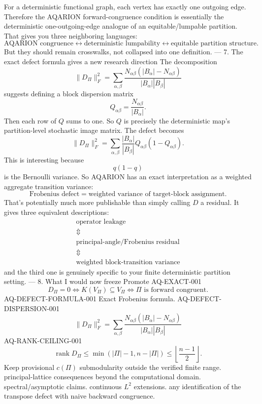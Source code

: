 For a deterministic functional graph, each vertex has exactly one outgoing edge. Therefore the AQARION forward-congruence condition is essentially the deterministic one-outgoing-edge analogue of an equitable/lumpable partition.
That gives you three neighboring languages:
\[
\boxed{
\text{AQARION congruence}
\leftrightarrow
\text{deterministic lumpability}
\leftrightarrow
\text{equitable partition structure}.
}
\]
But they should remain crosswalks, not collapsed into one definition.
---
7. The exact defect formula gives a new research direction
The decomposition
\[
\|D_\Pi\|_F^2
=
\sum_{\alpha,\beta}
\frac{N_{\alpha\beta}(|B_\alpha|-N_{\alpha\beta})}
{|B_\alpha||B_\beta|}
\]
suggests defining a block dispersion matrix
\[
Q_{\alpha\beta}
=
\frac{N_{\alpha\beta}}{|B_\alpha|}.
\]
Then each row of \(Q\) sums to one.
So \(Q\) is precisely the deterministic map's partition-level stochastic image matrix.
The defect becomes
\[
\|D_\Pi\|_F^2
=
\sum_{\alpha,\beta}
\frac{|B_\alpha|}{|B_\beta|}
Q_{\alpha\beta}(1-Q_{\alpha\beta}).
\]
This is interesting because
\[
q(1-q)
\]
is the Bernoulli variance.
So AQARION has an exact interpretation as a weighted aggregate transition variance:
\[
\boxed{
\text{Frobenius defect}
=
\text{weighted variance of target-block assignment}.
}
\]
That's potentially much more publishable than simply calling \(D\) a residual.
It gives three equivalent descriptions:
\[
\boxed{
\begin{array}{c}
\text{operator leakage}\\
\Updownarrow\\
\text{principal-angle/Frobenius residual}\\
\Updownarrow\\
\text{weighted block-transition variance}
\end{array}}
\]
and the third one is genuinely specific to your finite deterministic partition setting.
---
8. What I would now freeze
Promote
AQ-EXACT-001
\[
D_\Pi=0
\iff
K(V_\Pi)\subseteq V_\Pi
\iff
\Pi\text{ is forward congruent}.
\]
AQ-DEFECT-FORMULA-001
Exact Frobenius formula.
AQ-DEFECT-DISPERSION-001
\[
\boxed{
\|D_\Pi\|_F^2
=
\sum_{\alpha,\beta}
\frac{N_{\alpha\beta}(|B_\alpha|-N_{\alpha\beta})}
{|B_\alpha||B_\beta|}
}
\]
AQ-RANK-CEILING-001
\[
\boxed{
\operatorname{rank}D_\Pi
\le
\min(|\Pi|-1,n-|\Pi|)
\le
\left\lfloor\frac{n-1}{2}\right\rfloor.
}
\]
Keep provisional
\(c(\Pi)\) submodularity outside the verified finite range.
principal-lattice consequences beyond the computational domain.
spectral/asymptotic claims.
continuous \(L^2\) extensions.
any identification of the transpose defect with naive backward congruence.
